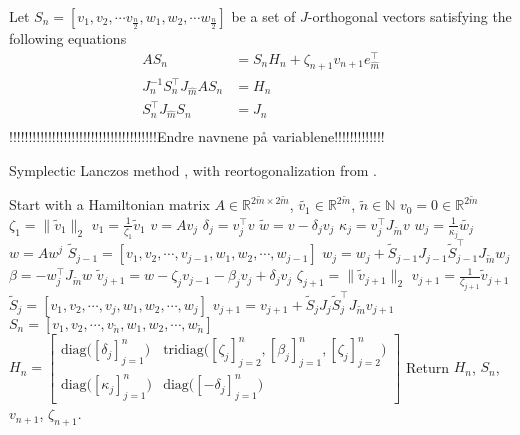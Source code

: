 Let $S_n = [v_1,v_2,\cdots v_{\frac{n}{2}},w_1,w_2,\cdots w_{\frac{n}{2}}]$ be a set of $J$-orthogonal vectors satisfying the following equations
\begin{equation}
\begin{aligned}
AS_n &= S_n H_n + \zeta_{n+1} v_{n+1} e_{\hat{m}}^\top\\
J_{n}^{-1} S_n^\top J_{\hat{m}} A S_n &= H_n \\
S_n^{\top} J_{\hat{m}} S_n &= J_{n}\\
\label{eqn:propS}
\end{aligned}
\end{equation}
!!!!!!!!!!!!!!!!!!!!!!!!!!!!!!!!!!!!!!Endre navnene på variablene!!!!!!!!!!!!!\\
\begin{algorithm} \caption{Symplectic Lanczos method \cite{SLM}, with reortogonalization from \cite{SLMO}. } \label{alg:symlanz}
\begin{algorithmic}
\STATE Start with a Hamiltonian matrix $A \in \mathbb{R}^{2\tilde{m} \times 2 \tilde{m}}$, $\tilde{v_1} \in \mathbb{R}^{2 \tilde{m}}$, $\tilde{n} \in \mathbb{N}$
\STATE $v_0= 0 \in \mathbb{R}^{2 \tilde{m}}$
\STATE $\zeta_1 = \| \tilde{v}_1\|_2$
\STATE $v_1= \frac{1}{\zeta_1}  \tilde{v}_1$
	\STATE $v = A v_j$
	\STATE $\delta_j =  v_j^\top v$
	\STATE $\tilde{w} = v-\delta_j v_j$
	\STATE $\kappa_j = v_j^\top J_{\tilde{m}} v $
	\STATE $w_j = \frac{1}{\kappa_j} \tilde{w_j}$
	\STATE $w = A w^j$
	\STATE $ \tilde{S}_{j-1} = [v_1,v_2,\cdots,v_{j-1},w_1,w_2,\cdots,w_{j-1}] $
	\STATE $ w_j = w_j + \tilde{S}_{j-1}J_{j-1} \tilde{S}_{j-1}^\top J_{\tilde{m}} w_j $
	\STATE $\beta = -w_j^\top J_{\tilde{m}} w$
	\STATE $\tilde{v}_{j+1} = w - \zeta_j v_{j-1} - \beta_j v_j + \delta_j v_j$
	\STATE $ \zeta_{j+1} = \|\tilde{v}_{j+1} \|_2 $
	\STATE $ v_{j+1} = \frac{1}{\zeta_{j+1}} \tilde{v}_{j+1} $
	\STATE $ \tilde{S}_j = [v_1,v_2,\cdots,v_{j},w_1,w_2,\cdots,w_{j}] $
	\STATE $ v_{j+1} = v_{j+1} + \tilde{S}_j J_j \tilde{S}_j^\top J_{\tilde{m}} v_{j+1} $
\ENDFOR
\STATE $S_n = [v_1,v_2,\cdots,v_{\tilde{n}},w_1,w_2,\cdots,w_{\tilde{n}}]$
\STATE $H_n = \begin{bmatrix}
\text{diag} \big( [\delta_j]^n_{j=1} \big) & \text{tridiag}\big( [\zeta_j]_{j=2}^n,[\beta_j]_{j=1}^n,[\zeta_j]_{j=2}^n \big) \\
\text{diag} \big( [\kappa_j]^n_{j=1} \big) & \text{diag} \big( [-\delta_j]^n_{j=1} \big)
\end{bmatrix} $
\STATE Return $H_n$, $S_n$, $v_{n+1}$, $\zeta_{n+1}$.
\end{algorithmic}
\end{algorithm}



